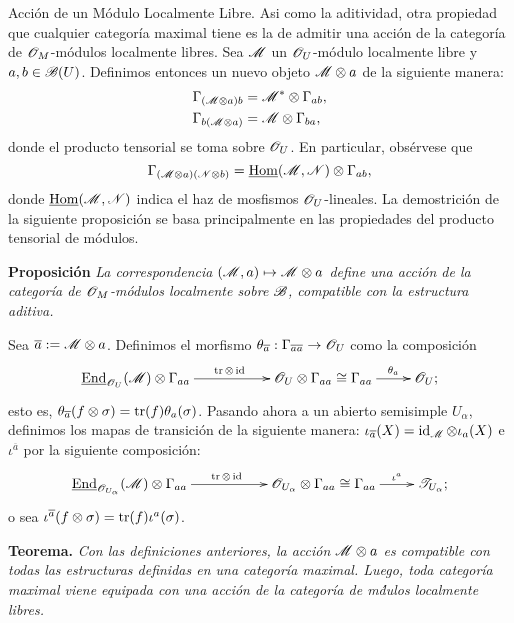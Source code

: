 {{\sc Acci\'on de un M\'odulo Localmente Libre.} Asi como la aditividad, otra propiedad que cualquier categor\'ia maximal tiene es la de admitir una acci\'on de la categor\'ia de $\mathscr{O}_M$-m\'odulos localmente libres. Sea $\mathscr{M}$ un $\mathscr{O}_U$-m\'odulo localmente libre y $a,b\in \mathscr{B}(U)$. Definimos entonces un nuevo objeto $\mathscr{M}\otimes a$ de la siguiente manera:
$$
\begin{aligned}
\Gamma_{(\mathscr{M}\otimes a)b} &= \mathscr{M}^*\otimes \Gamma_{ab}, \\
\Gamma_{b(\mathscr{M}\otimes a)} &= \mathscr{M} \otimes \Gamma_{ba}, \\
\end{aligned}
$$
donde el producto tensorial se toma sobre $\mathscr{O}_U$. En particular, obs\'ervese que
$$\Gamma_{(\mathscr{M}\otimes a)(\mathscr{N}\otimes b)}=\underline{\operatorname{Hom}}(\mathscr{M},\mathscr{N})\otimes \Gamma_{ab},$$
donde $\underline{\operatorname{Hom}}(\mathscr{M},\mathscr{N})$ indica el haz de mosfismos $\mathscr{O}_U$-lineales. La demostrici\'on de la siguiente proposici\'on se basa principalmente en las propiedades del producto tensorial de m\'odulos.
\medskip

{\bf Proposici\'on} {\it La correspondencia $(\mathscr{M},a)\mapsto \mathscr{M}\otimes a$ define una acci\'on de la categor\'ia de $\mathscr{O}_M$-m\'odulos localmente sobre $\mathscr{B}$, compatible con la estructura aditiva.}
\medskip

Sea $\overline{a}:=\mathscr{M}\otimes a$. Definimos el morfismo $\theta_{\overline{a}}:\Gamma_{\overline{a}\overline{a}}\to \mathscr{O}_U$ como la composici\'on
$$
\xymatrix{
\underline{\operatorname{End}}_{\scr{O}_U}(\scr{M})\otimes \Gamma_{aa} \ar[rr]^{\operatorname{tr}\otimes \operatorname{id}} & & \scr{O}_U\otimes \Gamma_{aa}\cong \Gamma_{aa} \ar[r]^-{\theta_a} & \scr{O}_U;}
$$
esto es, $\theta_{\overline{a}}(f\otimes \sigma )=\operatorname{tr}(f)\theta_a(\sigma )$. Pasando ahora a un abierto semisimple $U_\alpha$, definimos los mapas de transici\'on de la siguiente manera: $\iota_{\overline{a}}(X)=\operatorname{id}_{\mathscr{M}}\otimes \iota_a(X)$ e $\iota^{\overline{a}}$ por la siguiente composici\'on:
$$
\xymatrix{
\underline{\operatorname{End}}_{\scr{O}_{U_\alpha}}(\scr{M})\otimes \Gamma_{aa} \ar[rr]^{\operatorname{tr}\otimes \operatorname{id}} & & \scr{O}_{U_\alpha}\otimes \Gamma_{aa}\cong \Gamma_{aa} \ar[r]^-{\iota^a} & \scr{T}_{U_\alpha};}
$$
o sea $\iota^{\overline{a}}(f\otimes \sigma )=\operatorname{tr}(f)\iota^a(\sigma )$.
\medskip

{\bf Teorema.} {\it Con las definiciones anteriores, la acci\'on $\mathscr{M}\otimes a$ es compatible con todas las estructuras definidas en una categor\'ia maximal. Luego, toda categor\'ia maximal viene equipada con una acci\'on de la categor\'ia de m\'dulos localmente libres.}
\medskip

}
